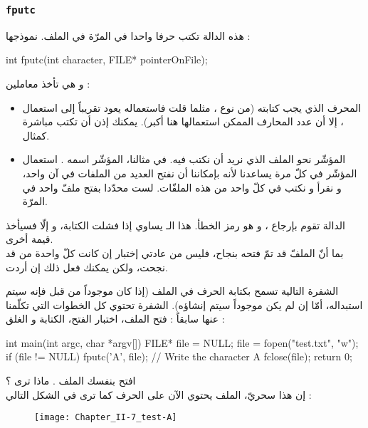 \subsubsection{\texttt{fputc}}

هذه الدالة تكتب حرفا واحدا في المرّة في الملف. نموذجها :

\begin{Csource}
int fputc(int character, FILE* pointerOnFile);
\end{Csource}

و هي تأخذ معاملين :

\begin{itemize}
  \item المحرف الذي يجب كتابته (من نوع
،
مثلما قلت فاستعماله يعود تقريباً إلى استعمال
،
إلا أن عدد المحارف الممكن استعمالها هنا أكبر). يمكنك إذن أن تكتب مباشرة
كمثال.
  \item المؤشّر نحو الملف الذي نريد أن نكتب فيه. في مثالنا، المؤشّر اسمه
.
استعمال المؤشّر في كلّ مرة يساعدنا لأنه بإمكاننا أن نفتح العديد من الملفات في آن واحد، و نقرأ و نكتب في كلّ واحد من هذه الملفّات. لست محدّدا بفتح ملفّ واحد في المرّة.
\end{itemize}

الدالة تقوم بإرجاع
،
و هو رمز الخطأ. هذا الـ
يساوي
إذا فشلت الكتابة، و إلّا فسيأخذ قيمة أخرى.\\
بما أنّ الملفّ قد تمّ فتحه بنجاح، فليس من عادتي إختبار إن كانت كلّ واحدة من
قد نجحت، ولكن يمكنك فعل ذلك إن أردت.

الشفرة التالية تسمح بكتابة الحرف
في الملف
(إذا كان موجوداً من قبل فإنه سيتم استبداله، أمّا إن لم يكن موجوداً سيتم إنشاؤه). الشفرة تحتوي كل الخطوات التي تكلّمنا عنها سابقاً : فتح الملف، اختبار الفتح، الكتابة و الغلق :

\begin{Csource}
int main(int argc, char *argv[])
{
    FILE* file = NULL;
    file = fopen("test.txt", "w");
    if (file != NULL)
    {
        fputc('A', file); // Write the character A
        fclose(file);
    }
    return 0;
}
\end{Csource}

افتح بنفسك الملف
.
ماذا ترى ؟\\
إن هذا سحريّ، الملف يحتوي الآن على الحرف
كما ترى في الشكل التالي :

\begin{figure}[H]
	\centering
	\texttt{[image: Chapter\_II-7\_test-A]}
\end{figure}

